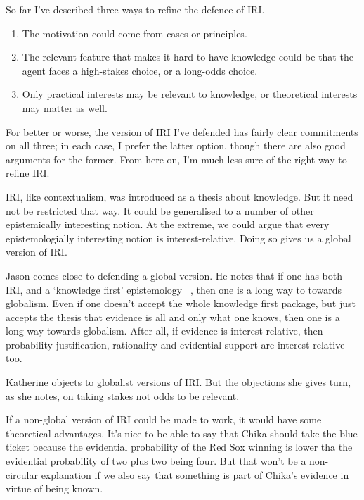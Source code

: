So far I've described three ways to refine the defence of IRI.

\begin{enumerate}
\item The motivation could come from cases or principles.

\item The relevant feature that makes it hard to have knowledge could be that the agent faces a high-stakes choice, or a long-odds choice.

\item Only practical interests may be relevant to knowledge, or theoretical interests may matter as well.

\end{enumerate}
For better or worse, the version of IRI I've defended has fairly clear commitments on all three; in each case, I prefer the latter option, though there are also good arguments for the former. From here on, I'm much less sure of the right way to refine IRI.

IRI, like contextualism, was introduced as a thesis about knowledge. But it need not be restricted that way. It could be generalised to a number of other epistemically interesting notion. At the extreme, we could argue that every epistemologially interesting notion is interest-relative. Doing so gives us a global version of IRI.

Jason  \citet{Stanley2005} comes close to defending a global version. He notes that if one has both IRI, and a `knowledge first' epistemology ~\citep{Williamson2000}, then one is a long way to towards globalism. Even if one doesn't accept the whole knowledge first package, but just accepts the thesis that evidence is all and only what one knows, then one is a long way towards globalism. After all, if evidence is interest-relative, then probability justification, rationality and evidential support are interest-relative too.

Katherine  \citet{Rubin2015} objects to globalist versions of IRI. But the objections she gives turn, as she notes, on taking stakes not odds to be relevant. 

If a non-global version of IRI could be made to work, it would have some theoretical advantages. It's nice to be able to say that Chika should take the blue ticket because the evidential probability of the Red Sox winning is lower tha the evidential probability of two plus two being four. But that won't be a non-circular explanation if we also say that something is part of Chika's evidence in virtue of being known.

